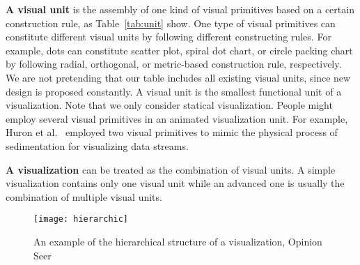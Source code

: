 \noindent
\textbf{A visual unit} is the assembly of one kind of visual primitives based on a certain construction rule, as Table~\ref{tab:unit} show. 
One type of visual primitives can constitute different visual units by following different constructing rules. For example, dots can constitute scatter plot, spiral dot chart, or circle packing chart by following radial, orthogonal, or metric-based construction rule, respectively. We are not pretending that our table includes all existing visual units, since new design is proposed constantly. A visual unit is the smallest functional unit of a visualization. Note that we only consider statical visualization. People might employ several visual primitives in an animated visualization unit. For example, Huron et al.~\cite{huron_visual_2013} employed two visual primitives to mimic the physical process of sedimentation for visualizing data streams. 

\noindent
\textbf{A visualization} can be treated as the combination of visual units. A simple visualization contains only one visual unit while an advanced one is usually the combination of multiple visual units. 

\begin{figure}
 \centering %
 \texttt{[image: hierarchic]}
 \caption{An example of the hierarchical structure of a visualization, Opinion Seer\cite{wu_opinionseer:_2010}}
 \label{fig:hierarchic}
\end{figure}


